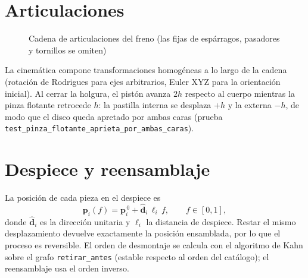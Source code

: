 \section{Articulaciones}
\begin{figure}[H]\centering
{}
\caption{Cadena de articulaciones del freno (las fijas de espárragos, pasadores y tornillos se omiten)}\label{fig:sim-articulaciones}
\end{figure}
La cinemática compone transformaciones homogéneas a lo largo de la cadena (rotación de Rodrigues para ejes
arbitrarios, Euler XYZ para la orientación inicial). Al cerrar la holgura, el pistón avanza $2h$ respecto al cuerpo
mientras la pinza flotante retrocede $h$: la pastilla interna se desplaza $+h$ y la externa $-h$, de modo que el
disco queda apretado por ambas caras (prueba \texttt{test\_pinza\_flotante\_aprieta\_por\_ambas\_caras}).

\section{Despiece y reensamblaje}
La posición de cada pieza en el despiece es
\[ \mathbf{p}_i(f) = \mathbf{p}_i^{\,0} + \hat{\mathbf{d}}_i \, \ell_i \, f, \qquad f \in [0,1], \]
donde $\hat{\mathbf{d}}_i$ es la dirección unitaria y $\ell_i$ la distancia de despiece. Restar el mismo
desplazamiento devuelve exactamente la posición ensamblada, por lo que el proceso es reversible. El orden de
desmontaje se calcula con el algoritmo de Kahn sobre el grafo \texttt{retirar\_antes} (estable respecto al orden del
catálogo); el reensamblaje usa el orden inverso.

